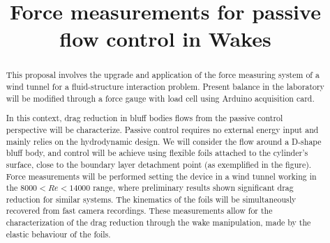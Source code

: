 \documentclass[english,12pt,a4paper]{article}
\begin{document}
	
	
	
	\title{Force measurements for passive flow control in Wakes}
	\date{}
	\maketitle
	\vspace{-1 cm}
	
	
	\begin{abstract}
		
		This proposal involves the upgrade and application of the force measuring system of a wind tunnel for a fluid-structure interaction problem. Present balance in the laboratory will be modified through a force gauge with load cell using Arduino acquisition card.
		
		In this context, drag reduction in bluff bodies flows from the passive control perspective will be characterize. Passive control requires no external energy input and mainly relies on the hydrodynamic design. We will consider the flow around a D-shape bluff body, and control will be achieve using flexible foils attached to the cylinder's surface, close to the boundary layer detachment point (as exemplified in the figure). Force measurements will be performed setting the device in a wind tunnel working in the $8000<Re<14000$ range, where preliminary results shown significant drag reduction for similar systems. The kinematics of the foils will be simultaneously recovered from fast camera recordings. These measurements allow for the characterization of the drag reduction through the wake manipulation, made by the elastic behaviour of the foils. 
		
		\begin{figure}[htb]
\centering\resizebox{.7\columnwidth}{!}{%
			
}
		\end{figure}
	\end{abstract}
	
\end{document}
